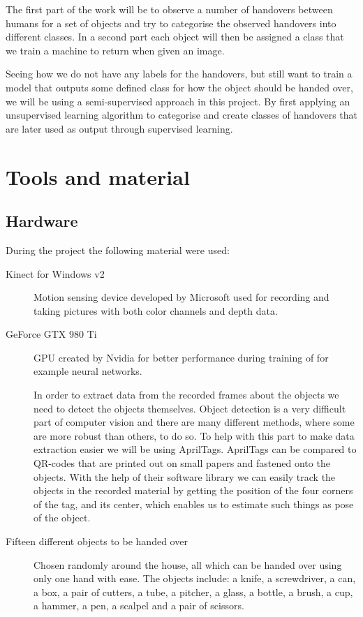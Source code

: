 The first part of the work will be to observe a number of handovers between humans for a set of objects and try to categorise the observed handovers into different classes. In a second part each object will then be assigned a class that we train a machine to return when given an image.

Seeing how we do not have any labels for the handovers, but still want to train a model that outputs some defined class for how the object should be handed over, we will be using a semi-supervised approach in this project. By first applying an unsupervised learning algorithm to categorise and create classes of handovers that are later used as output through supervised learning.

\section{Tools and material}

\subsection*{Hardware}

During the project the following material were used:
\begin{description}
	\item[Kinect for Windows v2] Motion sensing device developed by Microsoft used for recording and taking pictures with both color channels and depth data.

	\item[GeForce GTX 980 Ti] GPU created by Nvidia for better performance during training of for example neural networks.

	\item[\textcite{AprilTags}] In order to extract data from the recorded frames about the objects we need to detect the objects themselves. Object detection is a very difficult part of computer vision and there are many different methods, where some are more robust than others, to do so. To help with this part to make data extraction easier we will be using AprilTags. AprilTags can be compared to QR-codes that are printed out on small papers and fastened onto the objects. With the help of their software library we can easily track the objects in the recorded material by getting the position of the four corners of the tag, and its center, which enables us to estimate such things as pose of the object.

	\item[Fifteen different objects to be handed over] Chosen randomly around the house, all which can be handed over using only one hand with ease. The objects include: a knife, a screwdriver, a can, a box, a pair of cutters, a tube, a pitcher, a glass, a bottle, a brush, a cup, a hammer, a pen, a scalpel and a pair of scissors.

\end{description}

